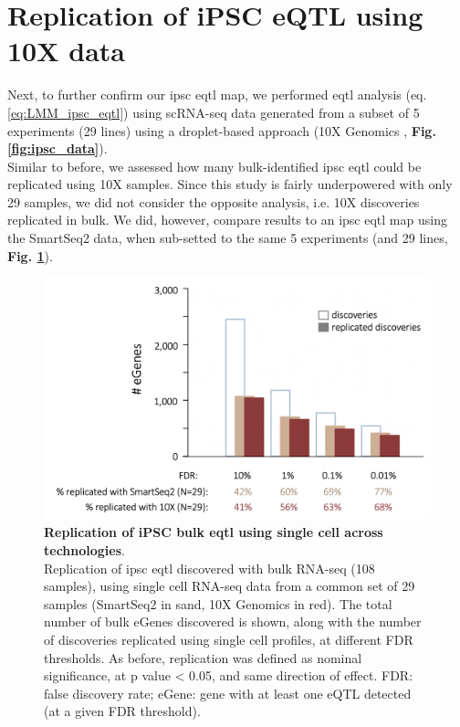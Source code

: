 
\section{Replication of iPSC eQTL using 10X data}

Next, to further confirm our \gls{ipsc} \gls{eqtl} map, we performed \gls{eqtl} analysis (eq. \eqref{eq:LMM_ipsc_eqtl}) using scRNA-seq data generated from a subset of 5 experiments (29 lines) using a droplet-based approach (10X Genomics \cite{zheng2017massively}, \textbf{Fig. \ref{fig:ipsc_data}}).\\

Similar to before, we assessed how many bulk-identified \gls{ipsc} \gls{eqtl} could be replicated using 10X samples.
Since this study is fairly underpowered with only 29 samples, we did not consider the opposite analysis, i.e. 10X discoveries replicated in bulk.
We did, however, compare results to an \gls{ipsc} \gls{eqtl} map using the SmartSeq2 data, when sub-setted to the same 5 experiments (and 29 lines, \textbf{Fig. \ref{fig:sc_bulk_10x_egenes}}). 

\begin{figure}[h]
\includegraphics[width=14.5cm]{Chapter3/Fig/sc_vs_bulk_vs_10x.png}
\caption[iPSC bulk eQTL replication]{\textbf{Replication of iPSC bulk \gls{eqtl} using single cell across technologies}.\\
Replication of \gls{ipsc} \gls{eqtl} discovered with bulk RNA-seq (108 samples), using single cell RNA-seq data from a common set of 29 samples (SmartSeq2 in sand, 10X Genomics in red). 
The total number of bulk eGenes discovered is shown, along with the number of discoveries replicated using single cell profiles, at different FDR thresholds. 
As before, replication was defined as nominal significance, at p value < 0.05, and same direction of effect.
FDR: false discovery rate; eGene: gene with at least one eQTL detected (at a given FDR threshold).}
\label{fig:sc_bulk_10x_egenes}
\end{figure}

